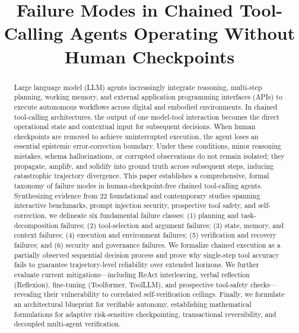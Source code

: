 \documentclass[conference]{IEEEtran}
\begin{document}
\title{Failure Modes in Chained Tool-Calling Agents Operating Without Human Checkpoints}

\author{
}

\maketitle

\begin{abstract}
Large language model (LLM) agents increasingly integrate reasoning, multi-step planning, working memory, and external application programming interfaces (APIs) to execute autonomous workflows across digital and embodied environments. In chained tool-calling architectures, the output of one model-tool interaction becomes the direct operational state and contextual input for subsequent decisions. When human checkpoints are removed to achieve uninterrupted execution, the agent loses an essential epistemic error-correction boundary. Under these conditions, minor reasoning mistakes, schema hallucinations, or corrupted observations do not remain isolated; they propagate, amplify, and solidify into ground truth across subsequent steps, inducing catastrophic trajectory divergence. This paper establishes a comprehensive, formal taxonomy of failure modes in human-checkpoint-free chained tool-calling agents. Synthesizing evidence from 22 foundational and contemporary studies spanning interactive benchmarks, prompt injection security, prospective tool safety, and self-correction, we delineate six fundamental failure classes: (1) planning and task-decomposition failures; (2) tool-selection and argument failures; (3) state, memory, and context failures; (4) execution and environment failures; (5) verification and recovery failures; and (6) security and governance failures. We formalize chained execution as a partially observed sequential decision process and prove why single-step tool accuracy fails to guarantee trajectory-level reliability over extended horizons. We further evaluate current mitigations---including ReAct interleaving, verbal reflection (Reflexion), fine-tuning (Toolformer, ToolLLM), and prospective tool-safety checks---revealing their vulnerability to correlated self-verification ceilings. Finally, we formulate an architectural blueprint for verifiable autonomy, establishing mathematical formulations for adaptive risk-sensitive checkpointing, transactional reversibility, and decoupled multi-agent verification.
\end{abstract}
\end{document}
